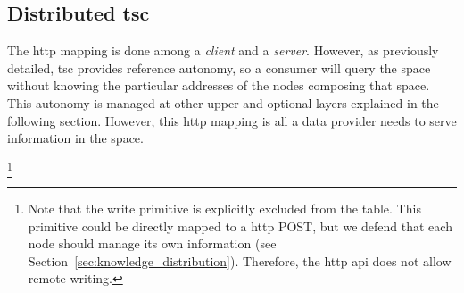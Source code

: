 









\subsection{Distributed \ac{tsc}}


The \acs{http} mapping is done among a \textit{client} and a \textit{server}.
However, as previously detailed, \ac{tsc} provides reference autonomy, so a consumer will query the space without knowing the particular addresses of the nodes composing that space.
This autonomy is managed at other upper and optional layers explained in the following section.
However, this \acs{http} mapping is all a data provider needs to serve information in the space.


\footnote{
  Note that the write primitive is explicitly excluded from the table.
  This primitive could be directly mapped to a \acs{http} POST,
  but we defend that each node should manage its own information
  (see Section~\ref{sec:knowledge_distribution}).
  Therefore, the \acs{http} \acs{api} does not allow remote writing.
}